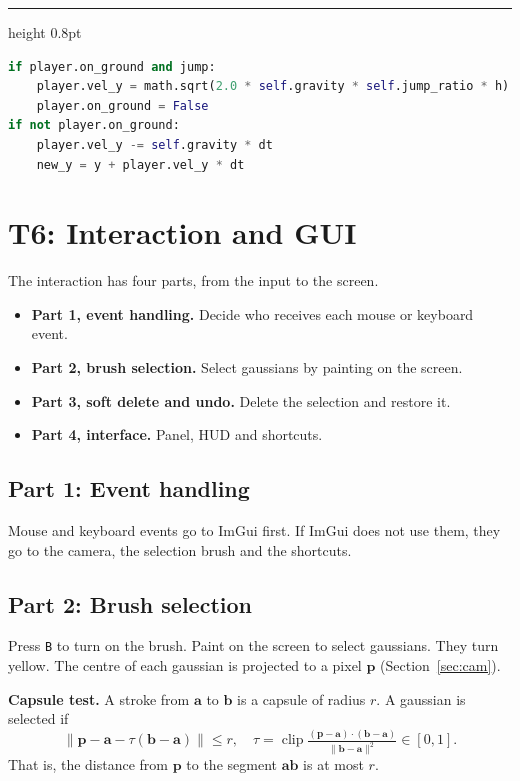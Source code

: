 \documentclass[9pt,twocolumn,a4paper]{extarticle}
\newenvironment{codebox}{\par\vspace{5pt}\noindent\begin{minipage}{\columnwidth}\hrule height 0.8pt\vspace{2pt}}{\end{minipage}\par\vspace{5pt}\noindent\ignorespaces}
\newcommand{\code}[1]{\texttt{#1}}
\begin{document}
\begin{codebox}
\begin{lstlisting}[language=Python,caption={\code{core/physics.py}, \code{Physics.walk}: jump and gravity},label={lst:jump}]
if player.on_ground and jump:
    player.vel_y = math.sqrt(2.0 * self.gravity * self.jump_ratio * h)
    player.on_ground = False
if not player.on_ground:
    player.vel_y -= self.gravity * dt
    new_y = y + player.vel_y * dt
\end{lstlisting}
\end{codebox}

\section{T6: Interaction and GUI}
\label{chap:t6}
The interaction has four parts, from the input to the screen.
\begin{itemize}\itemsep0pt
\item \textbf{Part 1, event handling.} Decide who receives each mouse or keyboard event.
\item \textbf{Part 2, brush selection.} Select gaussians by painting on the screen.
\item \textbf{Part 3, soft delete and undo.} Delete the selection and restore it.
\item \textbf{Part 4, interface.} Panel, HUD and shortcuts.
\end{itemize}

\subsection{Part 1: Event handling}
Mouse and keyboard events go to ImGui first. If ImGui does not use them, they go to the camera, the selection brush and the shortcuts.

\subsection{Part 2: Brush selection}
Press \code{B} to turn on the brush. Paint on the screen to select gaussians. They turn yellow. The centre of each gaussian is projected to a pixel $\mathbf{p}$ (Section~\ref{sec:cam}). 

\textbf{Capsule test.} A stroke from $\mathbf{a}$ to $\mathbf{b}$ is a capsule of radius $r$. A gaussian is selected if
\begin{equation}
\lVert\mathbf{p}-\mathbf{a}-\tau(\mathbf{b}-\mathbf{a})\rVert\le r,\quad \tau=\operatorname{clip}\tfrac{(\mathbf{p}-\mathbf{a})\cdot(\mathbf{b}-\mathbf{a})}{\lVert\mathbf{b}-\mathbf{a}\rVert^2}\in[0,1].
\label{eq:capsule}
\end{equation}
That is, the distance from $\mathbf{p}$ to the segment $\mathbf{ab}$ is at most $r$.
\end{document}
